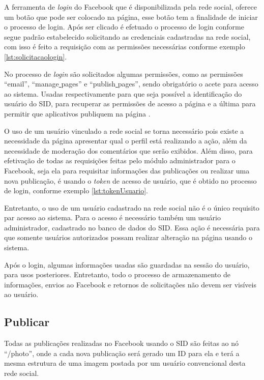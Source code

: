 A ferramenta de \textit{login} do Facebook que é disponibilizada pela rede social, oferece um botão que pode ser colocado na página, esse botão tem a finalidade de iniciar o processo de login. Após ser clicado é efetuado o processo de login conforme segue padrão estabelecido solicitando as credenciais cadastradas na rede social, com isso é feito a requisição com as permissões necessárias conforme exemplo \ref{lst:solicitacaologin}.

No processo de \textit{login} são solicitados algumas permissões, como as permissões “email”, “manage\underline{{ }}pages” e “publish\underline{{ }}pages”, sendo obrigatório o acete para acesso ao sistema. Usadas respectivamente para que seja possível a identificação do usuário do SID, para recuperar as permissões de acesso a página e a última para permitir que aplicativos publiquem na página \cite{facebook2018a}.

O uso de um usuário vinculado a rede social se torna necessário pois existe a necessidade da página apresentar qual o perfil está realizando a ação, além da necessidade de moderação dos comentários que serão exibidos.  Além disso, para efetivação de todas as requisições feitas pelo módulo administrador para o Facebook, seja ela para requisitar informações das publicações ou realizar uma nova publicação, é usando o \textit{token} de acesso de usuário, que é obtido no processo de login, conforme exemplo \ref{lst:tokenUsuario}.

Entretanto, o uso de um usuário cadastrado na rede social não é o único requisito par acesso ao sistema. Para o acesso é necessário também um usuário administrador, cadastrado no banco de dados do SID. Essa ação é necessária para que somente usuários autorizados possam realizar alteração na página usando o sistema.

Após o login, algumas informações usadas são guardadas na sessão do usuário, para usos posteriores. Entretanto, todo o processo de armazenamento de informações, envios ao Facebook e retornos de solicitações não devem ser visíveis ao usuário. 

\subsection{Publicar}
Todas as publicações realizadas no Facebook usando o SID são feitas ao nó ``/photo'', onde a cada nova publicação será gerado um ID para ela e terá a mesma estrutura de uma imagem postada por um usuário convencional desta rede social.


